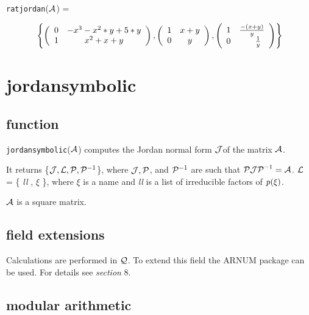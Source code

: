 {\tt ratjordan}(${\cal A}$) =
\begin{center}
\begin{displaymath}
\left\{ \left( \begin{array}{cc} 0 & -x^3-x^2*y+5*y \\ 1 &
x^2+x+y \end{array} \right), \left( \begin{array}{cc}
1 & x+y \\ 0 & y \end{array} \right), \left( \begin{array}{cc} 1 &
\frac{-(x+y)}{y} \\ 0 & \hspace{0.2in} \frac{1}{y} \end{array} \right)
\right\}
\end{displaymath}
\end{center}


\section{jordansymbolic}

\subsection{function}

{\tt jordansymbolic}(${\cal A}$) \hspace{0in} computes the Jordan
normal form ${\cal J}$of the matrix ${\cal A}$.

It returns \{${\cal J}, {\cal L}, {\cal P}, {\cal P}^{-1}$\}, where
${\cal J}, {\cal P}$, and ${\cal P}^{-1}$ are such that ${\cal P J P}^
{-1} = {\cal A}$. ${\cal L}$ = \{ {\it ll} , $\xi$ \}, where $\xi$ is
a name and {\it ll} is a list of irreducible factors of ${\it p}(\xi)$.

${\cal A}$ is a square matrix.

\subsection{field extensions}

Calculations are performed in ${\cal Q}$. To extend this field the
{\small ARNUM} package can be used. For details see {\it section} 8.

\subsection{modular arithmetic}

